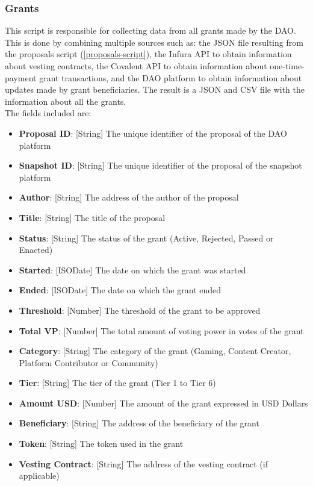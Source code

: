 \documentclass[MSE,Master,english]{twbook}%
\begin{document}
\subsubsection{Grants}
This script is responsible for collecting data from all grants made by the DAO. This is done by combining multiple sources such as: the JSON file resulting from the proposals script (\ref{proposals-script}), the Infura API to obtain information about vesting contracts, the Covalent API to obtain information about one-time-payment grant transactions, and the DAO platform to obtain information about updates made by grant beneficiaries. The result is a JSON and CSV file with the information about all the grants. \\

The fields included are:
\begin{itemize}
  \item \textbf{Proposal ID}: [String] The unique identifier of the proposal of the DAO platform
  \item \textbf{Snapshot ID}: [String] The unique identifier of the proposal of the snapshot platform
  \item \textbf{Author}: [String] The address of the author of the proposal
  \item \textbf{Title}: [String] The title of the proposal
  \item \textbf{Status}: [String] The status of the grant (Active, Rejected, Passed or Enacted)
  \item \textbf{Started}: [ISODate] The date on which the grant was started
  \item \textbf{Ended}: [ISODate] The date on which the grant ended
  \item \textbf{Threshold}: [Number] The threshold of the grant to be approved
  \item \textbf{Total VP}: [Number] The total amount of voting power in votes of the grant
  \item \textbf{Category}: [String] The category of the grant (Gaming, Content Creator, Platform Contributor or Community)
  \item \textbf{Tier}: [String] The tier of the grant (Tier 1 to Tier 6)
  \item \textbf{Amount USD}: [Number] The amount of the grant expressed in USD Dollars
  \item \textbf{Beneficiary}: [String] The address of the beneficiary of the grant
  \item \textbf{Token}: [String] The token used in the grant
  \item \textbf{Vesting Contract}: [String] The address of the vesting contract (if applicable)

\end{itemize}
\end{document}
